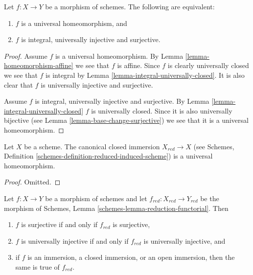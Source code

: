 \begin{lemma}
\label{lemma-universal-homeomorphism}
Let $f : X \to Y$ be a morphism of schemes. The following are
equivalent:
\begin{enumerate}
\item $f$ is a universal homeomorphism, and
\item $f$ is integral, universally injective and surjective.
\end{enumerate}
\end{lemma}

\begin{proof}
Assume $f$ is a universal homeomorphism. By
Lemma \ref{lemma-homeomorphism-affine}
we see that $f$ is affine. Since $f$ is clearly universally closed we
see that $f$ is integral by
Lemma \ref{lemma-integral-universally-closed}.
It is also clear that $f$ is universally injective and surjective.

\medskip\noindent
Assume $f$ is integral, universally injective and surjective. By
Lemma \ref{lemma-integral-universally-closed}
$f$ is universally closed. Since it is also universally bijective (see
Lemma \ref{lemma-base-change-surjective})
we see that it is a universal homeomorphism.
\end{proof}

\begin{lemma}
\label{lemma-reduction-universal-homeomorphism}
Let $X$ be a scheme. The canonical closed immersion $X_{red} \to X$ (see
Schemes, Definition \ref{schemes-definition-reduced-induced-scheme})
is a universal homeomorphism.
\end{lemma}

\begin{proof}
Omitted.
\end{proof}

\begin{lemma}
\label{lemma-reduction-morphism-properties}
\begin{reference}
\cite[Proposition 5.1.6]{EGA1}
\end{reference}
Let $f : X \to Y$ be a morphism of schemes and let
$f_{red} : X_{red} \to Y_{red}$ be the morphism of
Schemes, Lemma \ref{schemes-lemma-reduction-functorial}.
Then
\begin{enumerate}
\item $f$ is surjective if and only if $f_{red}$ is surjective,
\item $f$ is universally injective if and only if $f_{red}$ is universally
injective, and
\item if $f$ is an immersion, a closed immersion, or an open immersion, then
the same is true of $f_{red}$.
\end{enumerate}
\end{lemma}

